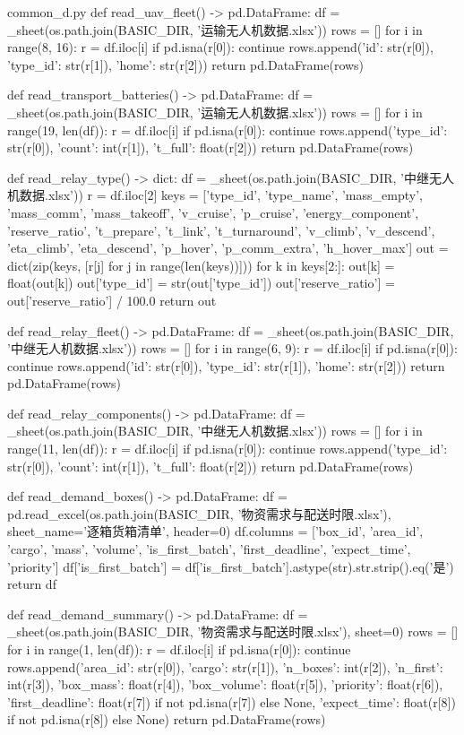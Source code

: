 \documentclass[bwprint]{gmcmthesis}
\begin{document}
\begin{appendices}
\begin{Python}{common\_d.py}
def read_uav_fleet() -> pd.DataFrame:
    df = _sheet(os.path.join(BASIC_DIR, '运输无人机数据.xlsx'))
    rows = []
    for i in range(8, 16):
        r = df.iloc[i]
        if pd.isna(r[0]):
            continue
        rows.append({'id': str(r[0]), 'type_id': str(r[1]), 'home': str(r[2])})
    return pd.DataFrame(rows)

def read_transport_batteries() -> pd.DataFrame:
    df = _sheet(os.path.join(BASIC_DIR, '运输无人机数据.xlsx'))
    rows = []
    for i in range(19, len(df)):
        r = df.iloc[i]
        if pd.isna(r[0]):
            continue
        rows.append({'type_id': str(r[0]), 'count': int(r[1]), 't_full': float(r[2])})
    return pd.DataFrame(rows)

def read_relay_type() -> dict:
    df = _sheet(os.path.join(BASIC_DIR, '中继无人机数据.xlsx'))
    r = df.iloc[2]
    keys = ['type_id', 'type_name', 'mass_empty', 'mass_comm', 'mass_takeoff', 'v_cruise', 'p_cruise', 'energy_component', 'reserve_ratio', 't_prepare', 't_link', 't_turnaround', 'v_climb', 'v_descend', 'eta_climb', 'eta_descend', 'p_hover', 'p_comm_extra', 'h_hover_max']
    out = dict(zip(keys, [r[j] for j in range(len(keys))]))
    for k in keys[2:]:
        out[k] = float(out[k])
    out['type_id'] = str(out['type_id'])
    out['reserve_ratio'] = out['reserve_ratio'] / 100.0
    return out

def read_relay_fleet() -> pd.DataFrame:
    df = _sheet(os.path.join(BASIC_DIR, '中继无人机数据.xlsx'))
    rows = []
    for i in range(6, 9):
        r = df.iloc[i]
        if pd.isna(r[0]):
            continue
        rows.append({'id': str(r[0]), 'type_id': str(r[1]), 'home': str(r[2])})
    return pd.DataFrame(rows)

def read_relay_components() -> pd.DataFrame:
    df = _sheet(os.path.join(BASIC_DIR, '中继无人机数据.xlsx'))
    rows = []
    for i in range(11, len(df)):
        r = df.iloc[i]
        if pd.isna(r[0]):
            continue
        rows.append({'type_id': str(r[0]), 'count': int(r[1]), 't_full': float(r[2])})
    return pd.DataFrame(rows)

def read_demand_boxes() -> pd.DataFrame:
    df = pd.read_excel(os.path.join(BASIC_DIR, '物资需求与配送时限.xlsx'), sheet_name='逐箱货箱清单', header=0)
    df.columns = ['box_id', 'area_id', 'cargo', 'mass', 'volume', 'is_first_batch', 'first_deadline', 'expect_time', 'priority']
    df['is_first_batch'] = df['is_first_batch'].astype(str).str.strip().eq('是')
    return df

def read_demand_summary() -> pd.DataFrame:
    df = _sheet(os.path.join(BASIC_DIR, '物资需求与配送时限.xlsx'), sheet=0)
    rows = []
    for i in range(1, len(df)):
        r = df.iloc[i]
        if pd.isna(r[0]):
            continue
        rows.append({'area_id': str(r[0]), 'cargo': str(r[1]), 'n_boxes': int(r[2]), 'n_first': int(r[3]), 'box_mass': float(r[4]), 'box_volume': float(r[5]), 'priority': float(r[6]), 'first_deadline': float(r[7]) if not pd.isna(r[7]) else None, 'expect_time': float(r[8]) if not pd.isna(r[8]) else None})
    return pd.DataFrame(rows)


\end{Python}
\end{appendices}
\end{document}
